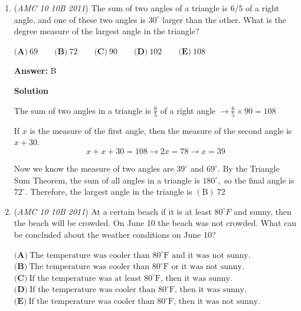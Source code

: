 \begin{enumerate}
\textbf{Solution 2}

We work backwards. If he had 8 candies at the end, then before he gave candies to his sister he had 12 candies. This means that at the end of Halloween he had 18 candies, so before he gave candies to his brother he had 20 candies. Therefore, at the start he had $\boxed{\textbf{(A)} 30}$




\textbf{Solution 3 (answer choices)}

A solve by algebra is more secure and safe (and usually faster), but you can also test the answer choices. We are lucky and option A works $\Longrightarrow \boxed{\textbf{(A) } 30}$.

 


	\item (\textit{AMC 10 10B 2011}) The sum of two angles of a triangle is $6/5$ of a right angle, and one of these two angles is $30^{\circ}$ larger than the other. What is the degree measure of the largest angle in the triangle?


 $\textbf{(A)}\ 69 \qquad\textbf{(B)}\ 72 \qquad\textbf{(C)}\ 90 \qquad\textbf{(D)}\ 102 \qquad\textbf{(E)}\ 108$

 \textbf{Answer: }B



\textbf{Solution}

The sum of two angles in a triangle is $\frac{6}{5}$ of a right angle $\longrightarrow \frac{6}{5} \times 90 = 108$

 If $x$ is the measure of the first angle, then the measure of the second angle is $x+30$.
 \[x + x + 30 = 108 \longrightarrow 2x = 78 \longrightarrow x = 39\]

 Now we know the measure of two angles are $39^{\circ}$ and $69^{\circ}$. By the Triangle Sum Theorem, the sum of all angles in a triangle is $180^{\circ},$ so the final angle is $72^{\circ}$. Therefore, the largest angle in the triangle is $\boxed{\mathrm{(B) \ } 72}$



	\item (\textit{AMC 10 10B 2011}) At a certain beach if it is at least $80^{\circ} F$ and sunny, then the beach will be crowded. On June 10 the beach was not crowded. What can be concluded about the weather conditions on June 10?


 $\textbf{(A)}\ \text{The temperature was cooler than } 80^{\circ} \text{F and it was not sunny.}$
$\textbf{(B)}\ \text{The temperature was cooler than } 80^{\circ} \text{F or it was not sunny.}$
$\textbf{(C)}\ \text{If the temperature was at least } 80^{\circ} \text{F, then it was sunny.}$
$\textbf{(D)}\ \text{If the temperature was cooler than } 80^{\circ} \text{F, then it was sunny.}$
$\textbf{(E)}\ \text{If the temperature was cooler than } 80^{\circ} \text{F, then it was not sunny.}$


\end{enumerate}
